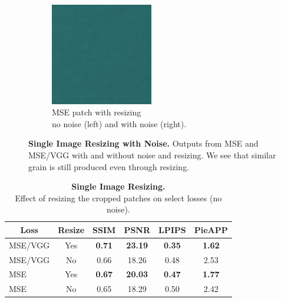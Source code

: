 \begin{figure}[ht]
\begin{subfigure}[b]{0.49\textwidth}
        \includegraphics[width=0.49\textwidth]{figures/mse-noise-resize-patch-single.png}
        \captionsetup{justification=centering}
        \caption{MSE patch with resizing \\ no noise (left) and with noise (right).}
    \end{subfigure}

    \caption{\textbf{Single Image Resizing with Noise.} Outputs from MSE and MSE/VGG with and without noise and resizing. We see that similar grain is still produced even through resizing.}
    \label{fig:single-image-resize-noise}
\end{figure}

\begin{table}
    \centering
    \captionsetup{justification=centering}
    \setlength{\tabcolsep}{0.5em}
    \caption{
        \textbf{Single Image Resizing.} \\ Effect of resizing the cropped patches on select losses (no noise).
    }
    \begin{tabular}{lccccc}
        \toprule
        \multicolumn{1}{c}{Loss}& \multicolumn{1}{c}{Resize}&  SSIM & PSNR & LPIPS & PieAPP\\
        \midrule
        MSE/VGG & Yes & \textbf{0.71} & \textbf{23.19} & \textbf{0.35} & \textbf{1.62} \\
        MSE/VGG & No & 0.66 & 18.26 & 0.48 & 2.53 \\
        \midrule
        MSE & Yes & \textbf{0.67} & \textbf{20.03} & \textbf{0.47} & \textbf{1.77} \\
        MSE & No & 0.65 & 18.29 & 0.50 & 2.42 \\

        \bottomrule
    \end{tabular}
    
    \label{tab:single-image-resize}
\end{table}


